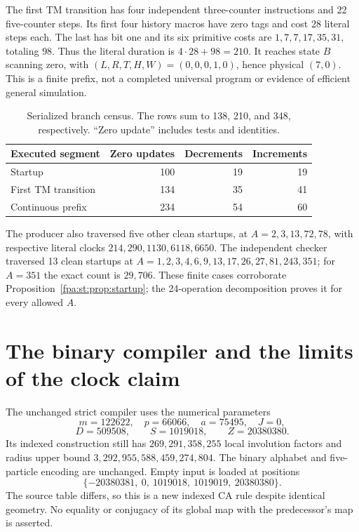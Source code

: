 \documentclass[11pt,a4paper]{article}
\numberwithin{equation}{section}
\begin{document}
The first TM transition has four independent three-counter instructions and
22 five-counter steps. Its first four history macros have zero tags and
cost $28$ literal steps each. The last has bit one and its six primitive
costs are $1,7,7,17,35,31$, totaling $98$. Thus the literal duration is
$4\cdot28+98=210$. It reaches state $B$ scanning zero, with
$(L,R,T,H,W)=(0,0,0,1,0)$, hence physical $(7,0)$. This is a finite prefix,
not a completed universal program or evidence of efficient general simulation.

\begin{table}[htbp]
\centering
\begin{tabular}{@{}lrrr@{}}
\toprule
Executed segment & Zero updates & Decrements & Increments\\
\midrule
Startup & 100 & 19 & 19\\
First TM transition & 134 & 35 & 41\\
Continuous prefix & 234 & 54 & 60\\
\bottomrule
\end{tabular}
\caption{Serialized branch census. The rows sum to 138, 210, and 348,
respectively. ``Zero update'' includes tests and identities.}
\end{table}

The producer also traversed five other clean startups, at $A=2,3,13,72,78$,
with respective literal clocks $214,290,1130,6118,6650$. The independent
checker traversed 13 clean startups at
$A=1,2,3,4,6,9,13,17,26,27,81,243,351$; for $A=351$ the exact count is
$29{,}706$. These finite cases corroborate Proposition~\ref{fpa:st:prop:startup};
the 24-operation decomposition proves it for every allowed $A$.

\section{The binary compiler and the limits of the clock claim}
\label{fpa:st:sec:ca}
The unchanged strict compiler uses the numerical parameters
\[
 m=122622,\quad p=66066,\quad a=75495,\quad J=0,
\]
\[
 D=509508,\qquad S=1019018,\qquad Z=20380380.
\]
Its indexed construction still has $269{,}291{,}358{,}255$ local involution
factors and radius upper bound $3{,}292{,}955{,}588{,}459{,}274{,}804$.
The binary alphabet and five-particle encoding are unchanged. Empty input
is loaded at positions
\[
 \{-20380381,\ 0,\ 1019018,\ 1019019,\ 20380380\}.
\]
The source table differs, so this is a new indexed CA rule despite identical
geometry. No equality or conjugacy of its global map with the predecessor's
map is asserted.
\end{document}
